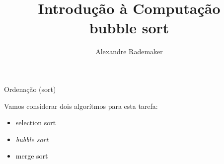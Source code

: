 \documentclass{beamer}
\title{Introdução à Computação \\ bubble sort}
\author{Alexandre Rademaker}
\date{}
\begin{document}
\begin{frame}
 \maketitle
\end{frame}


\begin{frame}{Ordenação (sort)}

  Vamos considerar dois algorítmos para esta tarefa:

  \begin{itemize}
  \item selection sort
  \item \emph{bubble sort}
  \item merge sort
  \end{itemize}

\end{frame}
\end{document}
